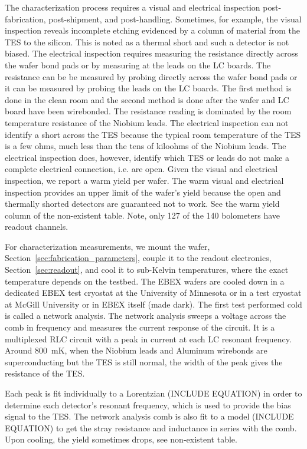 The characterization process requires a visual and electrical inspection post-fabrication, post-shipment, and post-handling. 
Sometimes, for example, the visual inspection reveals incomplete etching evidenced by a column of material from the TES to the silicon. 
This is noted as a thermal short and such a detector is not biased. 
The electrical inspection requires measuring the resistance directly across the wafer bond pads or by measuring at the leads on the \ac{LC} boards. 
The resistance can be be measured by probing directly across the wafer bond pads or it can be measured by probing the leads on the \ac{LC} boards. 
The first method is done in the clean room and the second method is done after the wafer and LC board have been wirebonded. 
The resistance reading is dominated by the room temperature resistance of the Niobium leads. 
The electrical inspection can not identify a short across the \ac{TES} because the typical room temperature of the TES is a few ohms, much less than the tens of kiloohms of the Niobium leads. 
The electrical inspection does, however, identify which \ac{TES} or leads do not make a complete electrical connection, i.e. are open. 
Given the visual and electrical inspection, we report a warm yield per wafer. 
The warm visual and electrical inspection provides an upper limit of the wafer's yield because the open and thermally shorted detectors are guaranteed not to work. 
See the warm yield column of the non-existent table. 
Note, only 127 of the 140 bolometers have readout channels. 

For characterization measurements, we mount the wafer, Section~\ref{sec:fabrication_parameters}, couple it to the readout electronics, Section~\ref{sec:readout}, and cool it to sub-Kelvin temperatures, where the exact temperature depends on the testbed. 
The \ac{EBEX} wafers are cooled down in a dedicated \ac{EBEX} test cryostat at the University of Minnesota or in a test cryostat at McGill University or in \ac{EBEX} itself (made dark). 
The first test performed cold is called a network analysis. 
The network analysis sweeps a voltage across the comb in frequency and measures the current response of the circuit. 
It is a multiplexed RLC circuit with a peak in current at each LC resonant frequency. 
Around 800~mK, when the Niobium leads and Aluminum wirebonds are superconducting but the TES is still normal, the width of the peak gives the resistance of the TES. 

Each peak is fit individually to a Lorentzian (INCLUDE EQUATION) in order to determine each detector's resonant frequency, which is used to provide the bias signal to the TES. 
The network analysis comb is also fit to a model (INCLUDE EQUATION) to get the stray resistance and inductance in series with the comb. 
Upon cooling, the yield sometimes drops, see non-existent table. 

